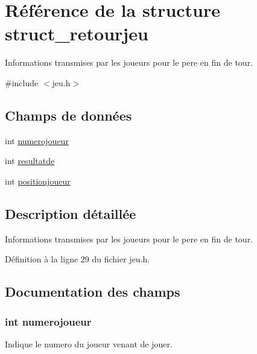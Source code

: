 \hypertarget{structstruct__retourjeu}{\section{Référence de la structure struct\-\_\-retourjeu}
\label{structstruct__retourjeu}
}


Informations transmises par les joueurs pour le pere en fin de tour.  




{\ttfamily \#include $<$jeu.\-h$>$}

\subsection*{Champs de données}
\begin{DoxyCompactItemize}
\item 
int \hyperlink{structstruct__retourjeu_a3e4028dc4a9077afc6e53e423343bd70}{numerojoueur}
\item 
int \hyperlink{structstruct__retourjeu_ac584e924232e3ffd27115c09c0fcc55d}{resultatde}
\item 
int \hyperlink{structstruct__retourjeu_a886601c5a72273d41b31c90740071a61}{positionjoueur}
\end{DoxyCompactItemize}


\subsection{Description détaillée}
Informations transmises par les joueurs pour le pere en fin de tour. 

Définition à la ligne 29 du fichier jeu.\-h.



\subsection{Documentation des champs}
\hypertarget{structstruct__retourjeu_a3e4028dc4a9077afc6e53e423343bd70}{
\subsubsection[{numerojoueur}]{\setlength{\rightskip}{0pt plus 5cm}int numerojoueur}}\label{structstruct__retourjeu_a3e4028dc4a9077afc6e53e423343bd70}
Indique le numero du joueur venant de jouer. 

